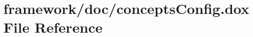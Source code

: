 \hypertarget{concepts_config_8dox}{}\section{framework/doc/concepts\+Config.dox File Reference}
\label{concepts_config_8dox}
